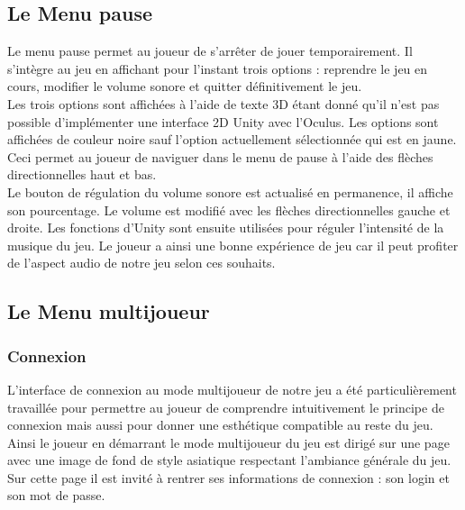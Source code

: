 \documentclass[12pt]{article}
\begin{document}
\subsection{Le Menu pause}

Le menu pause permet au joueur de s’arrêter de jouer temporairement. Il s’intègre au jeu en affichant pour l’instant trois options : reprendre le jeu en cours, modifier le volume sonore et quitter définitivement le jeu.\\
Les trois options sont affichées à l’aide de texte 3D étant donné qu’il n’est pas possible d’implémenter une interface 2D Unity avec l’Oculus. Les options sont affichées de couleur noire sauf l’option actuellement sélectionnée qui est en jaune. Ceci permet au joueur de naviguer dans le menu de pause à l’aide des flèches directionnelles haut et bas.\\

Le bouton de régulation du volume sonore est actualisé en permanence, il affiche son pourcentage. Le volume est modifié avec les flèches directionnelles gauche et droite. Les fonctions d’Unity sont ensuite utilisées pour réguler l’intensité de la musique du jeu. Le joueur a ainsi une bonne expérience de jeu car il peut profiter de l’aspect audio de notre jeu selon ces souhaits.

\subsection{Le Menu multijoueur}

\subsubsection{Connexion}

L’interface de connexion au mode multijoueur de notre jeu a été particulièrement travaillée pour permettre au joueur de comprendre intuitivement le principe de connexion mais aussi pour donner une esthétique compatible au reste du jeu. Ainsi le joueur en démarrant le mode multijoueur du jeu est dirigé sur une page avec une image de fond de style asiatique respectant l’ambiance générale du jeu. Sur cette page il est invité à rentrer ses informations de connexion : son login et son mot de passe. \\
\end{document}
